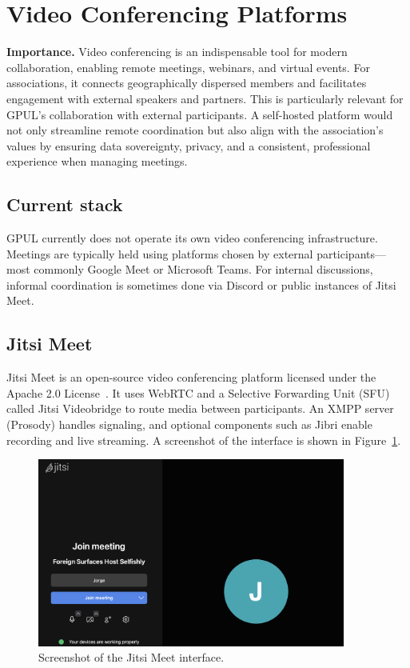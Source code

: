\section{Video Conferencing Platforms}

\textbf{Importance.} Video conferencing is an indispensable tool for modern collaboration, enabling remote meetings, webinars, and virtual events. For associations, it connects geographically dispersed members and facilitates engagement with external speakers and partners. This is particularly relevant for GPUL's collaboration with external participants. A self-hosted platform would not only streamline remote coordination but also align with the association's values by ensuring data sovereignty, privacy, and a consistent, professional experience when managing meetings.

\subsection*{Current stack}

GPUL currently does not operate its own video conferencing infrastructure. Meetings are typically held using platforms chosen by external participants—most commonly Google Meet or Microsoft Teams. For internal discussions, informal coordination is sometimes done via Discord or public instances of Jitsi Meet.

\subsection*{Jitsi Meet}

Jitsi Meet is an open-source video conferencing platform licensed under the Apache 2.0 License~\cite{jitsi-docs}. It uses WebRTC and a Selective Forwarding Unit (SFU) called Jitsi Videobridge to route media between participants. An XMPP server (Prosody) handles signaling, and optional components such as Jibri enable recording and live streaming. A screenshot of the interface is shown in Figure~\ref{fig:jitsi-ui}.

\begin{figure}[h!]
  \centering
  \includegraphics[width=0.9\textwidth]{imaxes/jitsi-ui.png}
  \caption{Screenshot of the Jitsi Meet interface.}
  \label{fig:jitsi-ui}
\end{figure}

